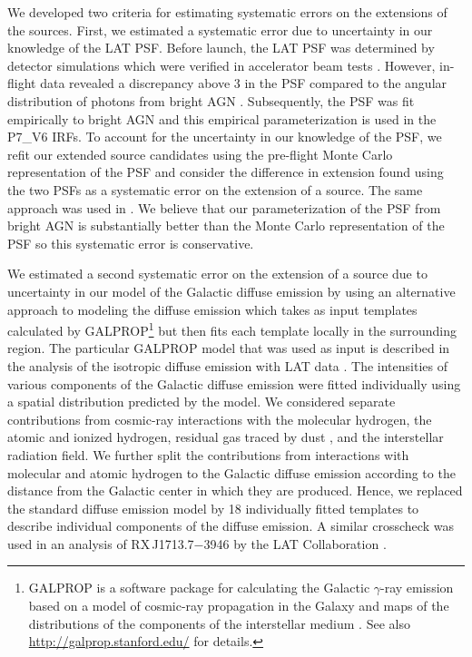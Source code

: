 We developed two criteria for estimating systematic errors
on the extensions of the sources.
First, we estimated a systematic error due to
uncertainty in our knowledge of the LAT PSF.  
Before launch, the LAT PSF
was determined by detector simulations which were verified in accelerator
beam tests \citep{atwood_2009a_large-telescope}. However, in-flight data revealed
a discrepancy above 3 \gev in the PSF compared to the angular
distribution of photons from bright AGN \citep{ackermann_2012a_fermi-large}.
Subsequently, the PSF was fit empirically to bright AGN and this
empirical parameterization is used in the P7\_V6 IRFs.  To account for
the uncertainty in our knowledge of the PSF, we refit our extended source
candidates using the pre-flight Monte Carlo representation of the PSF
and consider the difference in extension found using the two PSFs as a
systematic error on the extension of a source.  The same approach was used
in \cite{abdo_2010a_observation-supernova}.  We believe that our parameterization
of the PSF from bright AGN is substantially better than the Monte Carlo
representation of the PSF so this systematic error is conservative.

We estimated a second systematic error on the extension of a source
due to uncertainty in our model of the Galactic diffuse emission by
using an alternative 
approach to modeling the diffuse emission
which takes as input templates
calculated by
GALPROP\footnote{GALPROP is a software package for calculating the
Galactic $\gamma$-ray emission based on a model of cosmic-ray propagation
in the Galaxy and maps of the distributions of the 
components of the interstellar medium \citep{strong_1998a_propagation-cosmic-ray,vladimirov_2011a_galprop-webrun:}. 
See also \url{http://galprop.stanford.edu/} for details.} 
but then fits each template locally in
the surrounding region.
The particular GALPROP model that was used as input is described in
the analysis of the isotropic diffuse
emission with LAT data \citep{abdo_2010a_spectrum-isotropic}.  
The intensities of various components
of the Galactic diffuse emission were fitted individually using a
spatial distribution predicted by
the model.  
We considered separate contributions from
cosmic-ray interactions with the
molecular hydrogen, the atomic and ionized hydrogen, residual gas traced
by dust \citep{grenier_2005a_unveiling-extensive}, and the interstellar radiation
field. We further split the contributions from interactions with molecular
and atomic hydrogen to the Galactic diffuse emission according to the
distance from the Galactic center in which they are produced. Hence, we
replaced the standard diffuse emission model by 18 individually fitted
templates to describe individual components of the diffuse emission.
A similar crosscheck was used in an analysis of RX\,J1713.7$-$3946 
by the LAT Collaboration \citep{abdo_2011a_observations-young}.

